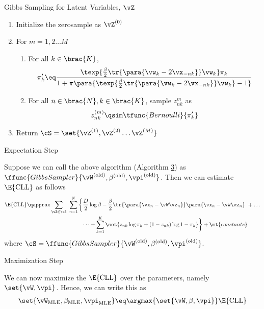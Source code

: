 \documentclass{article}
\begin{document}
\begin{question}
\begin{algo}[0.9\textwidth]{Gibbs Sampling for Latent Variables, $\vZ$}
		\begin{enumerate}
			\item Initialize the zero\tth sample as $\vZ^{(0)}$
			\item For $m = 1, 2 \dots M$
				\begin{enumerate}
					\item For all $k \in \brac{K}$,
						\begin{align*}
							\pi'_k	\eq	\frac{\texp{\frac{\beta}{2} \tr{\para{\vw_k - 2 \vx_{-nk}}} \vw_k} \pi_k}{1 + \pi \para{\texp{\frac{\beta}{2} \tr{\para{\vw_k - 2 \vx_{-nk}}} \vw_k} - 1}}
						\end{align*}
					\item For all $n \in \brac{N}, k \in \brac{K}$, sample $z_{nk}^{m}$ as
						\begin{align*}
							z_{nk}^{(m)}	\qsim	\tfunc{Bernoulli}{\pi'_k}
						\end{align*}
				\end{enumerate}
			\item Return $\cS = \set{\vZ^{(1)}, \vZ^{(2)} \dots \vZ^{(M)}}$
		\end{enumerate}

	\end{algo}

	\begin{qsubsection}{Expectation Step}

		Suppose we can call the above algorithm (Algorithm \hyperlink{algo:3}{3}) as $\ffunc{GibbsSampler}{\oW, \obeta, \opi}$. Then we can estimate $\E{\text{CLL}}$ as follows
		\begin{align*}
			\E{\text{CLL}}	&\qapprox	\sum_{\vZ \in \cS}\ \sum_{n = 1}^N \bigg\{ \frac{D}{2} \log{\beta} - \frac{\beta}{2} \tr{\para{\vx_n - \vW \vz_n}} \para{\vx_n - \vW \vz_n} \ + \dots\\
			&\hspace{35mm}\dots + \sum_{k = 1}^K \set{z_{nk} \log{\pi_k} + (1 - z_{nk}) \log{1 - \pi_k}} \bigg\} + \mt{constants}
		\end{align*}
		where $\cS = \ffunc{GibbsSampler}{\oW, \obeta, \opi}$.

	\end{qsubsection}

	\begin{qsubsection}{Maximization Step}

		We can now maximize the $\E{\text{CLL}}$ over the parameters, namely $\set{\vW, \vpi}$. Hence, we can write this as
		\begin{align*}
			\set{\vW_{\text{MLE}}, \beta_{\text{MLE}}, \vpi_{\text{MLE}}}	\eq	\argmax{\set{\vW, \beta, \vpi}} \E{\text{CLL}}
		\end{align*}


\end{qsubsection}
\end{question}
\end{document}
